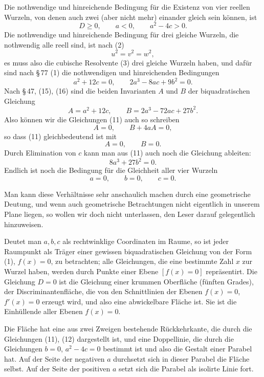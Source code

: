 \documentclass[11pt]{article}
\begin{document}
Die nothwendige und hinreichende Bedingung f\"ur die Existenz von vier reellen Wurzeln, von denen auch zwei (aber nicht mehr) einander gleich sein k\"onnen, ist
\begin{equation}
        D\geq 0,
        \qquad a<0,
        \qquad a^2-4c>0.
\tag{10}
\end{equation}
Die nothwendige und hinreichende Bedingung f\"ur drei gleiche Wurzeln, die nothwendig alle reell sind, ist nach (2)
\[
        u^2=v^2=w^2,
\]
es muss also die cubische Resolvente (3) drei gleiche Wurzeln haben, und daf\"ur sind nach \S\,77 (1) die nothwendigen und hinreichenden Bedingungen
\begin{equation}
        a^2+12c=0,
        \qquad
        2a^3-8ac+9b^2=0.
\tag{11}
\end{equation}
Nach \S\,47, (15), (16) sind die beiden Invarianten $A$ und $B$ der biquadratischen Gleichung
\[
        A=a^2+12c,
        \qquad
        B=2a^3-72ac+27b^2.
\]
Also k\"onnen wir die Gleichungen (11) auch so schreiben
\[
        A=0,
        \qquad B+4aA=0,
\]
so dass (11) gleichbedeutend ist mit
\[
        A=0,
        \qquad B=0.
\]
Durch Elimination von $c$ kann man aus (11) auch noch die Gleichung ableiten:
\begin{equation}
        8a^3+27b^2=0.
\tag{12}
\end{equation}
Endlich ist noch die Bedingung f\"ur die Gleichheit aller vier Wurzeln
\begin{equation}
        a=0,
        \qquad b=0,
        \qquad c=0.
\tag{13}
\end{equation}

Man kann diese Verh\"altnisse sehr anschaulich machen durch eine geometrische Deutung, und wenn auch geometrische Betrachtungen nicht eigentlich in unserem Plane liegen, so wollen wir doch nicht unterlassen, den Leser darauf gelegentlich hinzuweisen.

Deutet man $a,b,c$ als rechtwinklige Coordinaten im Raume, so ist jeder Raumpunkt als Tr\"ager einer gewissen biquadratischen Gleichung von der Form (1), $f(x)=0$, zu betrachten; alle Gleichungen, die eine bestimmte Zahl $x$ zur Wurzel haben, werden durch Punkte einer Ebene $[f(x)=0]$ repr\"asentirt. Die Gleichung $D=0$ ist die Gleichung einer krummen Oberfl\"ache (f\"unften Grades), der Discriminantenfl\"ache, die von den Schnittlinien der Ebenen $f(x)=0$, $f'(x)=0$ erzeugt wird, und also eine abwickelbare Fl\"ache ist. Sie ist die Einh\"ullende aller Ebenen $f(x)=0$.

Die Fl\"ache hat eine aus zwei Zweigen bestehende R\"uckkehrkante, die durch die Gleichungen (11), (12) dargestellt ist, und eine Doppellinie, die durch die Gleichungen $b=0$, $a^2-4c=0$ bestimmt ist und also die Gestalt einer Parabel hat. Auf der Seite der negativen $a$ durchsetzt sich in dieser Parabel die Fl\"ache selbst. Auf der Seite der positiven $a$ setzt sich die Parabel als isolirte Linie fort.
\end{document}
